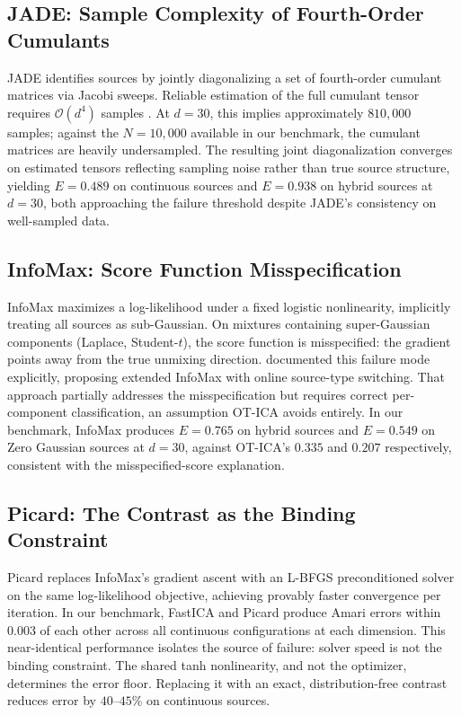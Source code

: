 \documentclass{tpm2026} %
\begin{document}
\subsection{JADE: Sample Complexity of Fourth-Order Cumulants}
JADE \citep{cardoso1993blind} identifies sources by jointly diagonalizing a set of fourth-order cumulant matrices via Jacobi sweeps. 
Reliable estimation of the full cumulant tensor requires $\mathcal{O}(d^4)$ samples \citep{cardoso1993blind, hyvarinen2001}. 
At $d=30$, this implies approximately $810{,}000$ samples; against the $N=10{,}000$ available in our benchmark, the cumulant matrices are heavily undersampled. 
The resulting joint diagonalization converges on estimated tensors reflecting sampling noise rather than true source structure, yielding $E=0.489$ 
on continuous sources and $E=0.938$ on hybrid sources at $d=30$, both approaching the failure threshold despite JADE's consistency on well-sampled data.

\subsection{InfoMax: Score Function Misspecification}
InfoMax \citep{bell1995information} maximizes a log-likelihood under a fixed logistic nonlinearity, implicitly treating all sources as sub-Gaussian. 
On mixtures containing super-Gaussian components (Laplace, Student-$t$), the score function is misspecified: the gradient points away from 
the true unmixing direction. \citet{lee1999extended} documented this failure mode explicitly, proposing extended InfoMax with online source-type switching. 
That approach partially addresses the misspecification but requires correct per-component classification, an assumption OT-ICA avoids entirely. 
In our benchmark, InfoMax produces $E=0.765$ on hybrid sources and $E=0.549$ on Zero Gaussian sources at $d=30$, against OT-ICA's $0.335$ and $0.207$ respectively, 
consistent with the misspecified-score explanation.

\subsection{Picard: The Contrast as the Binding Constraint}
Picard \citep{ablin2018faster} replaces InfoMax's gradient ascent with an L-BFGS preconditioned solver on the same log-likelihood objective, 
achieving provably faster convergence per iteration. In our benchmark, FastICA and Picard produce Amari errors within $0.003$ of each other across 
all continuous configurations at each dimension. This near-identical performance isolates the source of failure: solver speed is not the binding constraint. 
The shared tanh nonlinearity, and not the optimizer, determines the error floor. Replacing it with an exact, distribution-free contrast reduces error by $40$--$45\%$ on continuous sources.
\end{document}
